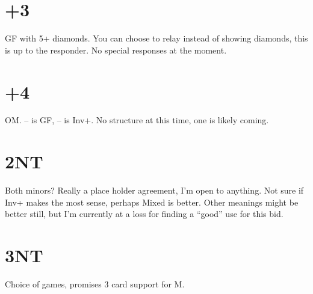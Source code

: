 \documentclass[tom-ari]{subfile}
\begin{document}
	\section{+3}
	
	GF with 5+ diamonds.  You can choose to relay instead of showing diamonds, this is up to the responder.  No special responses at the moment.
	
	\section{+4}
	
	OM.  -- is GF, -- is Inv+.  No structure at this time, one is likely coming. 
	
	\section{2NT}
	
	Both minors?  Really a place holder agreement, I'm open to anything.  Not sure if Inv+ makes the most sense, perhaps Mixed is better.  Other meanings might be better still, but I'm currently at a loss for finding a ``good'' use for this bid.
	
	\section[2S]{}
	
	
	\section{3NT}
	
	Choice of games, promises 3 card support for M.
		
\end{document}
